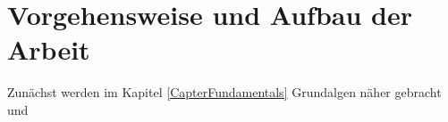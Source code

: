 \section{Vorgehensweise und Aufbau der Arbeit}

Zunächst werden im Kapitel \ref{CapterFundamentals} Grundalgen näher gebracht und  
 

